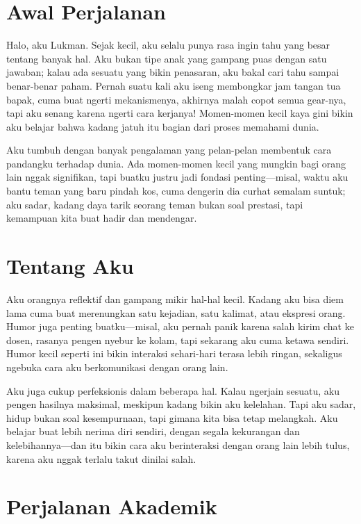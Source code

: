 \documentclass[
  letterpaper,
  DIV=11,
  numbers=noendperiod]{scrreprt}
\begin{document}
\section{Awal Perjalanan}\label{awal-perjalanan}

Halo, aku Lukman. Sejak kecil, aku selalu punya rasa ingin tahu yang
besar tentang banyak hal. Aku bukan tipe anak yang gampang puas dengan
satu jawaban; kalau ada sesuatu yang bikin penasaran, aku bakal cari
tahu sampai benar-benar paham. Pernah suatu kali aku iseng membongkar
jam tangan tua bapak, cuma buat ngerti mekanismenya, akhirnya malah
copot semua gear-nya, tapi aku senang karena ngerti cara kerjanya!
Momen-momen kecil kaya gini bikin aku belajar bahwa kadang jatuh itu
bagian dari proses memahami dunia.

Aku tumbuh dengan banyak pengalaman yang pelan-pelan membentuk cara
pandangku terhadap dunia. Ada momen-momen kecil yang mungkin bagi orang
lain nggak signifikan, tapi buatku justru jadi fondasi penting---misal,
waktu aku bantu teman yang baru pindah kos, cuma dengerin dia curhat
semalam suntuk; aku sadar, kadang daya tarik seorang teman bukan soal
prestasi, tapi kemampuan kita buat hadir dan mendengar.

\section{Tentang Aku}\label{tentang-aku}

Aku orangnya reflektif dan gampang mikir hal-hal kecil. Kadang aku bisa
diem lama cuma buat merenungkan satu kejadian, satu kalimat, atau
ekspresi orang. Humor juga penting buatku---misal, aku pernah panik
karena salah kirim chat ke dosen, rasanya pengen nyebur ke kolam, tapi
sekarang aku cuma ketawa sendiri. Humor kecil seperti ini bikin
interaksi sehari-hari terasa lebih ringan, sekaligus ngebuka cara aku
berkomunikasi dengan orang lain.

Aku juga cukup perfeksionis dalam beberapa hal. Kalau ngerjain sesuatu,
aku pengen hasilnya maksimal, meskipun kadang bikin aku kelelahan. Tapi
aku sadar, hidup bukan soal kesempurnaan, tapi gimana kita bisa tetap
melangkah. Aku belajar buat lebih nerima diri sendiri, dengan segala
kekurangan dan kelebihannya---dan itu bikin cara aku berinteraksi dengan
orang lain lebih tulus, karena aku nggak terlalu takut dinilai salah.

\section{Perjalanan Akademik}\label{perjalanan-akademik}
\end{document}

